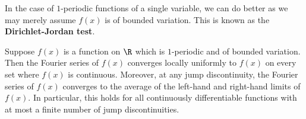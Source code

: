   In the case of \(1\)-periodic functions of a single variable, we can do better as we may merely assume \(f(x)\) is of bounded variation. This is known as the \textbf{Dirichlet-Jordan test}.

  \begin{theorem*}
    Suppose \(f(x)\) is a function on \(\R\) which is \(1\)-periodic and of bounded variation. Then the Fourier series of \(f(x)\) converges locally uniformly to \(f(x)\) on every set where \(f(x)\) is continuous. Moreover, at any jump discontinuity, the Fourier series of \(f(x)\) converges to the average of the left-hand and right-hand limits of \(f(x)\). In particular, this holds for all continuously differentiable functions with at most a finite number of jump discontinuities.
  \end{theorem*}